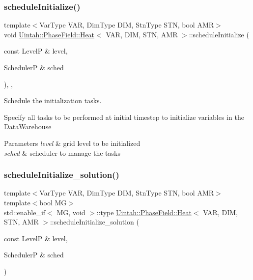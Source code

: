 \subsubsection{\texorpdfstring{schedule\+Initialize()}{scheduleInitialize()}}
{\footnotesize\ttfamily template$<$Var\+Type V\+AR, Dim\+Type D\+IM, Stn\+Type S\+TN, bool A\+MR$>$ \\
void \hyperlink{classUintah_1_1PhaseField_1_1Heat}{Uintah\+::\+Phase\+Field\+::\+Heat}$<$ V\+AR, D\+IM, S\+TN, A\+MR $>$\+::schedule\+Initialize (\begin{DoxyParamCaption}\item[{const LevelP \&}]{level,  }\item[{SchedulerP \&}]{sched }\end{DoxyParamCaption})\hspace{0.3cm}{\ttfamily [override]}, {\ttfamily [protected]}, {\ttfamily [virtual]}}



Schedule the initialization tasks. 

Specify all tasks to be performed at initial timestep to initialize variables in the Data\+Warehouse


\begin{DoxyParams}{Parameters}
{\em level} & grid level to be initialized \\
\hline
{\em sched} & scheduler to manage the tasks \\
\hline
\end{DoxyParams}
\mbox{\label{classUintah_1_1PhaseField_1_1Heat_a0ee0e3cbb32c28fd0cb4b567cb0dbd9b}} 
\subsubsection{\texorpdfstring{schedule\+Initialize\+\_\+solution()}{scheduleInitialize\_solution()}\hspace{0.1cm}{\footnotesize\ttfamily [1/2]}}
{\footnotesize\ttfamily template$<$Var\+Type V\+AR, Dim\+Type D\+IM, Stn\+Type S\+TN, bool A\+MR$>$ \\
template$<$bool MG$>$ \\
std\+::enable\+\_\+if$<$ MG, void $>$\+::type \hyperlink{classUintah_1_1PhaseField_1_1Heat}{Uintah\+::\+Phase\+Field\+::\+Heat}$<$ V\+AR, D\+IM, S\+TN, A\+MR $>$\+::schedule\+Initialize\+\_\+solution (\begin{DoxyParamCaption}\item[{const LevelP \&}]{level,  }\item[{SchedulerP \&}]{sched }\end{DoxyParamCaption})\hspace{0.3cm}{\ttfamily [protected]}}




